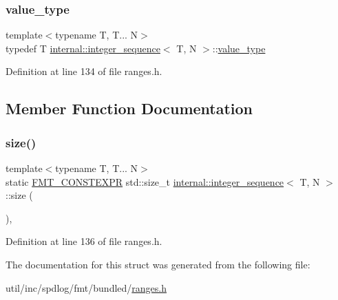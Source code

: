 \subsubsection{\texorpdfstring{value\+\_\+type}{value\_type}}
{\footnotesize\ttfamily template$<$typename T, T... N$>$ \\
typedef T \hyperlink{structinternal_1_1integer__sequence}{internal\+::integer\+\_\+sequence}$<$ T, N $>$\+::\hyperlink{structinternal_1_1integer__sequence_a877cd78e25267b5543b8d1be45a8d10a}{value\+\_\+type}}



Definition at line 134 of file ranges.\+h.



\subsection{Member Function Documentation}
\mbox{\label{structinternal_1_1integer__sequence_a9790e41d81dc6a30550b4a23c30a413d}} 
\subsubsection{\texorpdfstring{size()}{size()}}
{\footnotesize\ttfamily template$<$typename T, T... N$>$ \\
static \hyperlink{core_8h_a69201cb276383873487bf68b4ef8b4cd}{F\+M\+T\+\_\+\+C\+O\+N\+S\+T\+E\+X\+PR} std\+::size\+\_\+t \hyperlink{structinternal_1_1integer__sequence}{internal\+::integer\+\_\+sequence}$<$ T, N $>$\+::size (\begin{DoxyParamCaption}{ }\end{DoxyParamCaption})\hspace{0.3cm}{\ttfamily [inline]}, {\ttfamily [static]}}



Definition at line 136 of file ranges.\+h.



The documentation for this struct was generated from the following file\+:\begin{DoxyCompactItemize}
\item 
util/inc/spdlog/fmt/bundled/\hyperlink{ranges_8h}{ranges.\+h}\end{DoxyCompactItemize}
